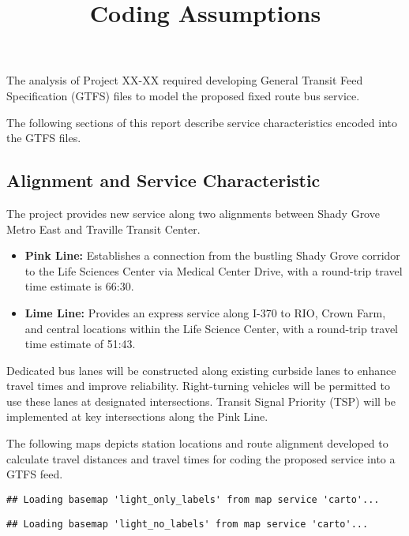 \documentclass[
]{article}
\title{Coding Assumptions}
\author{}
\date{\vspace{-2.5em}}
\begin{document}
\maketitle

The analysis of Project XX-XX required developing General Transit Feed
Specification (GTFS) files to model the proposed fixed route bus
service.

The following sections of this report describe service characteristics
encoded into the GTFS files.

\subsection{Alignment and Service
Characteristic}\label{alignment-and-service-characteristic}

The project provides new service along two alignments between Shady
Grove Metro East and Traville Transit Center.

\begin{itemize}
\item
  \textbf{Pink Line:} Establishes a connection from the bustling Shady
  Grove corridor to the Life Sciences Center via Medical Center Drive,
  with a round-trip travel time estimate is 66:30.
\item
  \textbf{Lime Line:} Provides an express service along I-370 to RIO,
  Crown Farm, and central locations within the Life Science Center, with
  a round-trip travel time estimate of 51:43.
\end{itemize}

Dedicated bus lanes will be constructed along existing curbside lanes to
enhance travel times and improve reliability. Right-turning vehicles
will be permitted to use these lanes at designated intersections.
Transit Signal Priority (TSP) will be implemented at key intersections
along the Pink Line.

The following maps depicts station locations and route alignment
developed to calculate travel distances and travel times for coding the
proposed service into a GTFS feed.

\begin{verbatim}
## Loading basemap 'light_only_labels' from map service 'carto'...
\end{verbatim}

\begin{verbatim}
## Loading basemap 'light_no_labels' from map service 'carto'...
\end{verbatim}
\end{document}
